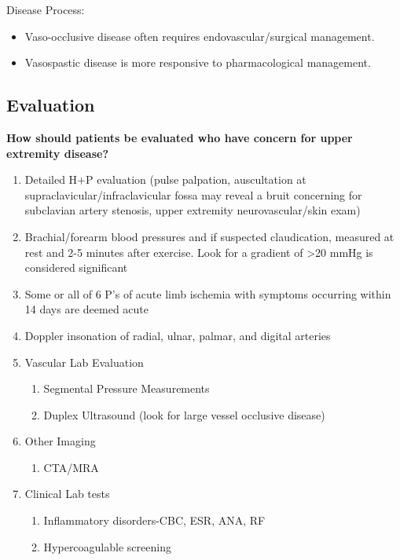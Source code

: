 \documentclass[
]{book}
\providecommand{\tightlist}{%
  \setlength{\itemsep}{0pt}\setlength{\parskip}{0pt}}
\begin{document}
Disease Process:

\begin{itemize}
\tightlist
\item
  Vaso-occlusive disease often requires endovascular/surgical
  management.
\item
  Vasospastic disease is more responsive to pharmacological
  management.
\end{itemize}

\hypertarget{evaluation}{%
\subsection{Evaluation}\label{evaluation}}

\textbf{How should patients be evaluated who have concern for upper extremity
disease?}

\begin{enumerate}
\def\labelenumi{\arabic{enumi}.}
\item
  Detailed H+P evaluation (pulse palpation, auscultation at
  supraclavicular/infraclavicular fossa may reveal a bruit concerning
  for subclavian artery stenosis, upper extremity neurovascular/skin
  exam)
\item
  Brachial/forearm blood pressures and if suspected claudication,
  measured at rest and 2-5 minutes after exercise. Look for a gradient
  of \textgreater20 mmHg is considered significant
\item
  Some or all of 6 P's of acute limb ischemia with symptoms occurring
  within 14 days are deemed acute
\item
  Doppler insonation of radial, ulnar, palmar, and digital arteries
\item
  Vascular Lab Evaluation

  \begin{enumerate}
  \def\labelenumii{\arabic{enumii}.}
  \item
    Segmental Pressure Measurements
  \item
    Duplex Ultrasound (look for large vessel occlusive disease)
  \end{enumerate}
\item
  Other Imaging

  \begin{enumerate}
  \def\labelenumii{\arabic{enumii}.}
  \tightlist
  \item
    CTA/MRA
  \end{enumerate}
\item
  Clinical Lab tests

  \begin{enumerate}
  \def\labelenumii{\arabic{enumii}.}
  \item
    Inflammatory disorders-CBC, ESR, ANA, RF
  \item
    Hypercoagulable screening
  \end{enumerate}
\end{enumerate}
\end{document}
